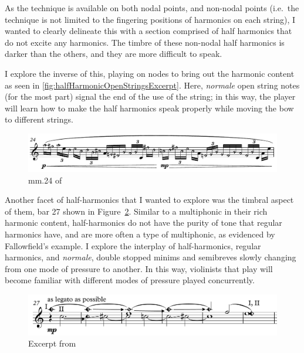 As the technique is available on both nodal points, and non-nodal points (i.e.\ the technique is not limited to the fingering positions of harmonics on each string), I wanted to clearly delineate this with a section comprised of half harmonics that do not excite any harmonics. 
The timbre of these non-nodal half harmonics is darker than the others, and they are more difficult to speak.

I explore the inverse of this, playing on nodes to bring out the harmonic content as seen in \autoref{fig:halfHarmonicOpenStringsExcerpt}.
Here, \emph{normale} open string notes (for the most part) signal the end of the use of the string; in this way, the player will learn how to make the half harmonics speak properly while moving the bow to different strings.

\begin{figure}
  \includegraphics[width=\linewidth]{./resources/halfHarmonicOpenStringsExcerpt.pdf}
  \caption{mm.\@ 24 of \violinPiece}\label{fig:halfHarmonicOpenStringsExcerpt}
\end{figure}

Another facet of half-harmonics that I wanted to explore was the timbral aspect of them, bar 27 shown in Figure~\ref{fig:violinHalfHarmonicsExcerpt27}.
Similar to a multiphonic in their rich harmonic content, half-harmonics do not have the purity of tone that regular harmonics have, and are more often a type of multiphonic, as evidenced by Fallowfield's example.\autocite[]{fallowfieldCelloMapHalf2013}
I explore the interplay of half-harmonics, regular harmonics, and \emph{normale}, double stopped minims and semibreves slowly changing from one mode of pressure to another.
In this way, violinists that play \violinPiece\space will become familiar with different modes of pressure played concurrently.

\begin{figure}
    \includegraphics[width=\linewidth]{./resources/violinHalfHarmonicsExcerpt27.pdf}
    \caption{Excerpt from \violinPiece}\label{fig:violinHalfHarmonicsExcerpt27}
  \end{figure}

